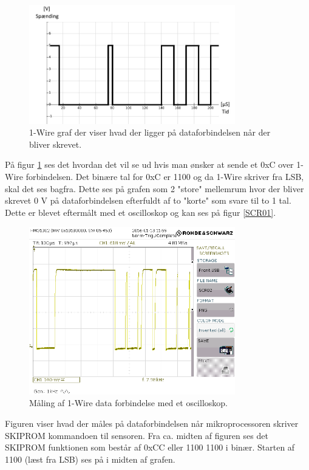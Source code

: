 \begin{figure}[h!]
  \centering
  \includegraphics[width=0.8\textwidth]{figures/onewire.png}
  \caption{1-Wire graf der viser hvad der ligger på dataforbindelsen når der bliver skrevet.}
  \label{onewire_graph}
\end{figure}

På figur \ref{onewire_graph} ses det hvordan det vil se ud hvis man ønsker at sende et 0xC over 1-Wire forbindelsen. Det binære tal for 0xC er 1100 og da 1-Wire skriver fra LSB, skal det ses bagfra. Dette ses på grafen som 2 "store" mellemrum hvor der bliver skrevet 0 V på dataforbindelsen efterfuldt af to "korte" som svare til to 1 tal. Dette er blevet eftermålt med et oscilloskop og kan ses på figur \ref{SCR01}.


\begin{figure}[h!]
  \centering
  \includegraphics[width=0.8\textwidth]{figures/SCR02.png}
  \caption{Måling af 1-Wire data forbindelse med et oscilloskop.}
  \label{SCR02}
\end{figure}

Figuren viser hvad der måles på dataforbindelsen når mikroprocessoren skriver SKIPROM kommandoen til sensoren.
Fra ca. midten af figuren ses det SKIPROM funktionen som består af 0xCC eller 1100 1100 i binær. Starten af 1100 (læst fra LSB) ses på i midten af grafen.